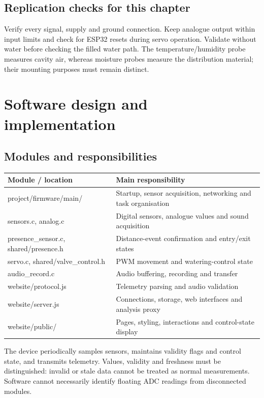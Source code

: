 \documentclass[10pt,a4paper]{article}
\begin{document}
\subsection{Replication checks for this chapter}

Verify every signal, supply and ground connection. Keep analogue output within input limits and check for ESP32 resets during servo operation. Validate without water before checking the filled water path. The temperature/humidity probe measures cavity air, whereas moisture probes measure the distribution material; their mounting purposes must remain distinct.



\section{Software design and implementation}

\subsection{Modules and responsibilities}

\begin{longtable}{>{\raggedright\arraybackslash}p{54mm}>{\raggedright\arraybackslash}p{111mm}}
\toprule
\textbf{Module / location} & \textbf{Main responsibility}\\\midrule\endhead
project/firmware/main/ & Startup, sensor acquisition, networking and task organisation\\
sensors.c, analog.c & Digital sensors, analogue values and sound acquisition\\
presence\_sensor.c, shared/presence.h & Distance-event confirmation and entry/exit states\\
servo.c, shared/valve\_control.h & PWM movement and watering-control state\\
audio\_record.c & Audio buffering, recording and transfer\\
website/protocol.js & Telemetry parsing and audio validation\\
website/server.js & Connections, storage, web interfaces and analysis proxy\\
website/public/ & Pages, styling, interactions and control-state display\\
\bottomrule\end{longtable}

The device periodically samples sensors, maintains validity flags and control state, and transmits telemetry. Values, validity and freshness must be distinguished: invalid or stale data cannot be treated as normal measurements. Software cannot necessarily identify floating ADC readings from disconnected modules.
\end{document}

